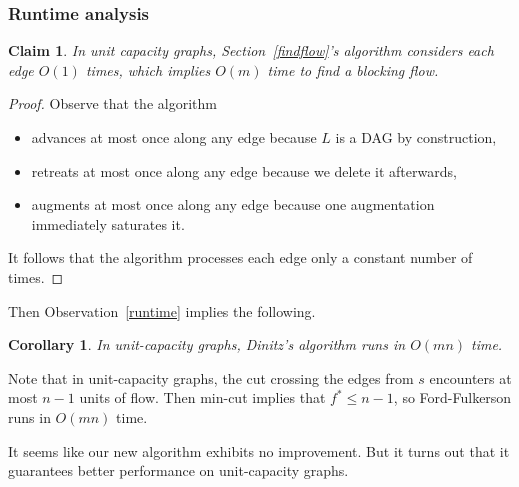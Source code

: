 \documentclass[11pt]{article}
\newtheorem*{corollary}{Corollary}
\newtheorem*{claim}{Claim}
\begin{document}
\subsubsection{Runtime analysis}
\begin{claim}
In unit capacity graphs, Section~\ref{findflow}'s algorithm considers each edge $O(1)$ times, which implies $O(m)$ time to find a blocking flow.
\end{claim}
\begin{proof}
Observe that the algorithm 
\begin{itemize}
\item advances at most once along any edge because $L$ is a DAG by construction,
\item retreats at most once along any edge because we delete it afterwards,
\item augments at most once along any edge because one augmentation immediately saturates it.
\end{itemize} It follows that the algorithm processes each edge only a constant number of times.
\end{proof}

Then Observation~\ref{runtime} implies the following.
\begin{corollary}
In unit-capacity graphs, Dinitz's algorithm runs in $O(mn)$ time.
\end{corollary}

Note that in unit-capacity graphs, the cut crossing the edges from $s$ encounters at most $n-1$ units of flow. Then min-cut implies that $f^*\leq n-1$, so Ford-Fulkerson runs in $O(mn)$ time. 

It seems like our new algorithm exhibits no improvement. But it turns out that it guarantees better performance on unit-capacity graphs.
\end{document}
